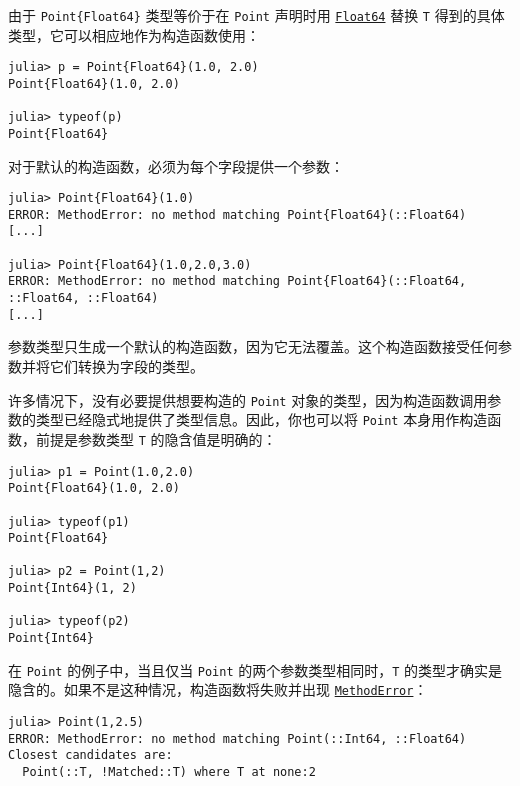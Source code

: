 由于 \texttt{Point\{Float64\}} 类型等价于在 \texttt{Point} 声明时用 \hyperlink{5027751419500983000}{\texttt{Float64}} 替换 \texttt{T} 得到的具体类型，它可以相应地作为构造函数使用：




\begin{verbatim}
julia> p = Point{Float64}(1.0, 2.0)
Point{Float64}(1.0, 2.0)

julia> typeof(p)
Point{Float64}
\end{verbatim}



对于默认的构造函数，必须为每个字段提供一个参数：




\begin{verbatim}
julia> Point{Float64}(1.0)
ERROR: MethodError: no method matching Point{Float64}(::Float64)
[...]

julia> Point{Float64}(1.0,2.0,3.0)
ERROR: MethodError: no method matching Point{Float64}(::Float64, ::Float64, ::Float64)
[...]
\end{verbatim}



参数类型只生成一个默认的构造函数，因为它无法覆盖。这个构造函数接受任何参数并将它们转换为字段的类型。



许多情况下，没有必要提供想要构造的 \texttt{Point} 对象的类型，因为构造函数调用参数的类型已经隐式地提供了类型信息。因此，你也可以将 \texttt{Point} 本身用作构造函数，前提是参数类型 \texttt{T} 的隐含值是明确的：




\begin{verbatim}
julia> p1 = Point(1.0,2.0)
Point{Float64}(1.0, 2.0)

julia> typeof(p1)
Point{Float64}

julia> p2 = Point(1,2)
Point{Int64}(1, 2)

julia> typeof(p2)
Point{Int64}
\end{verbatim}



在 \texttt{Point} 的例子中，当且仅当 \texttt{Point} 的两个参数类型相同时，\texttt{T} 的类型才确实是隐含的。如果不是这种情况，构造函数将失败并出现 \hyperlink{68769522931907606}{\texttt{MethodError}}：




\begin{verbatim}
julia> Point(1,2.5)
ERROR: MethodError: no method matching Point(::Int64, ::Float64)
Closest candidates are:
  Point(::T, !Matched::T) where T at none:2
\end{verbatim}



